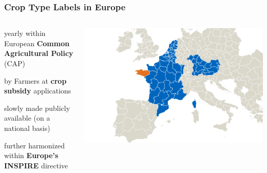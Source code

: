 \documentclass[%
  aspectratio=169,
  9pt,
  USenglish,
  titlegraphic, %
  affiliationintitlepagehead,
  progressbar,
]{beamer}
\begin{document}
\begin{frame}
\frametitle{Crop Type Labels in Europe}

\begin{columns}
	
	
	\Large
	
	\begin{description}\setlength\itemsep{1em}
		\item[\color{tumblue}collected] yearly within European \textbf{Common Agricultural Policy} (CAP)
		\item[\color{tumblue}declared] by Farmers at \textbf{crop subsidy} applications
		\item[\color{tumblue}today] slowly made publicly available (on a national basis)
		\item[\color{tumblue}in future] further harmonized within \textbf{Europe's INSPIRE} directive
	\end{description}
	
	\includegraphics[width=\textwidth]{images/europe_data2}
	
	
\end{columns}
\end{frame}
\end{document}
